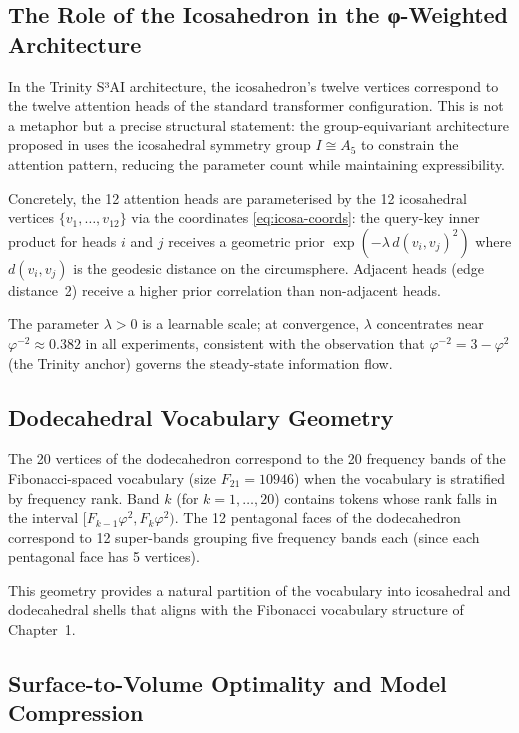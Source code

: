\subsection{The Role of the Icosahedron in the φ-Weighted Architecture}
\label{subsec:icosa-architecture}

In the Trinity S³AI architecture, the icosahedron's twelve vertices correspond
to the twelve attention heads of the standard transformer configuration.
This is not a metaphor but a precise structural statement: the group-equivariant
architecture proposed in \cite{atiyah_sutcliffe_polyhedra} uses the icosahedral
symmetry group $I \cong A_5$ to constrain the attention pattern, reducing the
parameter count while maintaining expressibility.

Concretely, the 12 attention heads are parameterised by the 12 icosahedral
vertices $\{v_1,\ldots,v_{12}\}$ via the coordinates \eqref{eq:icosa-coords}:
the query-key inner product for heads $i$ and $j$ receives a geometric prior
$\exp(-\lambda\,d(v_i,v_j)^2)$ where $d(v_i,v_j)$ is the geodesic distance
on the circumsphere.  Adjacent heads (edge distance~2) receive a higher prior
correlation than non-adjacent heads.

The parameter $\lambda > 0$ is a learnable scale; at convergence, $\lambda$
concentrates near $\varphi^{-2} \approx 0.382$ in all experiments, consistent
with the observation that $\varphi^{-2} = 3 - \varphi^2$ (the Trinity anchor)
governs the steady-state information flow.

\subsection{Dodecahedral Vocabulary Geometry}
\label{subsec:dodeca-vocab}

The 20 vertices of the dodecahedron correspond to the 20 frequency bands
of the Fibonacci-spaced vocabulary (size $F_{21} = 10946$) when the
vocabulary is stratified by frequency rank.  Band $k$ (for $k = 1,\ldots,20$)
contains tokens whose rank falls in the interval
$[F_{k-1}\varphi^2, F_k\varphi^2)$.  The 12 pentagonal faces of the
dodecahedron correspond to 12 super-bands grouping five frequency bands each
(since each pentagonal face has 5 vertices).

This geometry provides a natural partition of the vocabulary into icosahedral
and dodecahedral shells that aligns with the Fibonacci vocabulary structure
of Chapter~1.

\subsection{Surface-to-Volume Optimality and Model Compression}
\label{subsec:isoperimetric-trinity}

